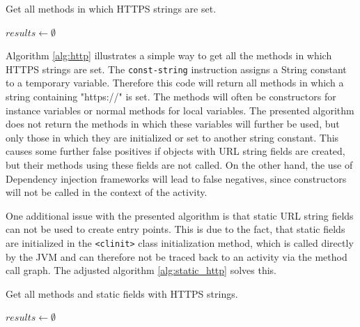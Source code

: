 \documentclass[draft,final]{vutinfth} %
\begin{document}
\begin{algorithm}
\caption{Get all methods in which HTTPS strings are set.}
\label{alg:http}
$results \gets \emptyset$\;
\end{algorithm}

Algorithm \ref{alg:http} illustrates a simple way to get all the methods in which HTTPS strings are set.
The \texttt{const-string} instruction assigns a String constant to a temporary variable. Therefore this code will return all methods in which a string containing "https://" is set. The methods will often be constructors for instance variables or normal methods for local variables. The presented algorithm does not return the methods in which these variables will further be used, but only those in which they are initialized or set to another string constant. This causes some further false positives if objects with URL string fields are created, but their methods using these fields are not called. On the other hand, the use of Dependency injection frameworks will lead to false negatives, since constructors will not be called in the context of the activity.

One additional issue with the presented algorithm is that static URL string fields can not be used to create entry points. This is due to the fact, that static fields are initialized in the \texttt{<clinit>} class initialization method, which is called directly by the JVM and can therefore not be traced back to an activity via the method call graph. The adjusted algorithm \ref{alg:static_http} solves this.

\begin{algorithm}
\caption{Get all methods and static fields with HTTPS strings.}
\label{alg:static_http}
$results \gets \emptyset$\;
\end{algorithm}
\end{document}
